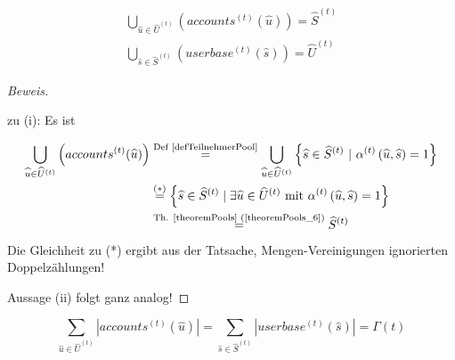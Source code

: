\vspace{0.6cm}

\begin{Lemma}\label{lemmaPools}

\begin{align}
\bigcup_{\widehat{u} \in \widehat{U}^{(t)}} \left(accounts^{(t)} (\widehat{u})\right) = \widehat{S}^{(t)} \tag{i} \\
\bigcup_{\widehat{s} \in \widehat{S}^{(t)}} \left(userbase^{(t)} (\widehat{s})\right) = \widehat{U}^{(t)} \tag{ii}
\end{align}

\end{Lemma}

\vspace{0.3cm}

\begin{proof}[Beweis] \textrm{ }

\vspace{0.3cm}

zu (i): Es ist

\begin{align*}
\bigcup_{\widehat{u} \in \widehat{U}^{(t)}} \left(accounts^{(t)} (\widehat{u})\right) &\overset{\text{Def \ref{defTeilnehmerPool}}}{=} \bigcup_{\widehat{u} \in \widehat{U}^{(t)}} \left\{\widehat{s} \in \widehat{S}^{(t)} \textrm{ } | \textrm{ } \alpha^{(t)}\left(\widehat{u}, \widehat{s}\right) = 1 \right\} \\
&\overset{(*)}{=} \left\{\widehat{s} \in \widehat{S}^{(t)} \mid \exists \widehat{u} \in \widehat{U}^{(t)} \textrm{ mit } \alpha^{(t)}\left(\widehat{u}, \widehat{s}\right) = 1 \right\} \\
&\overset{\text{Th. \ref{theoremPools} (\ref{theoremPools_6})}}{=} \widehat{S}^{(t)}
\end{align*}
Die Gleichheit zu (*) ergibt aus der Tatsache, Mengen-Vereinigungen ignorierten Doppelzählungen! 

\vspace{0.3cm}

Aussage (ii) folgt ganz analog!

\end{proof}

\vspace{0.3cm}


\begin{Theorem}\label{theremPoolsCount}

\begin{equation*}
\sum_{\widehat{u} \in \widehat{U}^{(t)}} |accounts^{(t)} (\widehat{u})| = \sum_{\widehat{s} \in \widehat{S}^{(t)}} |userbase^{(t)} (\widehat{s})| = \Gamma(t)
\end{equation*}

\end{Theorem}

